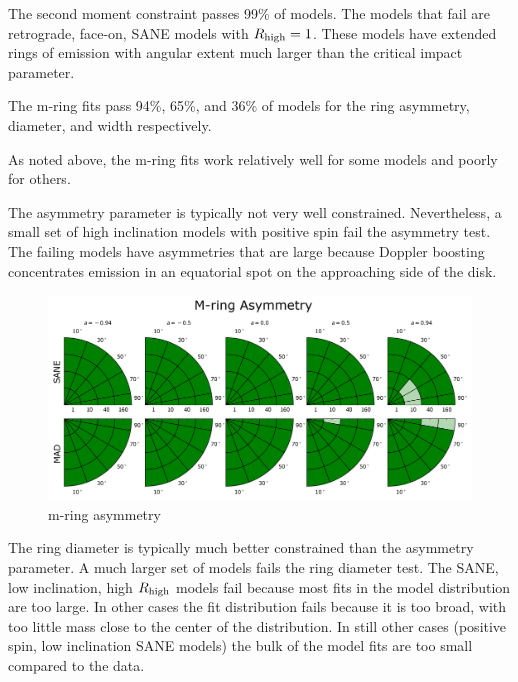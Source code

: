 The second moment constraint passes 99\% of models.  The models that fail are retrograde, face-on, SANE models with $R_\mathrm{high} = 1$. These models have extended rings of emission with angular extent much larger than the critical impact parameter.


The m-ring fits pass 94\%, 65\%, and 36\% of models for the ring asymmetry, diameter, and width respectively.

As noted above, the m-ring fits work relatively well for some models and poorly for others.

The asymmetry parameter is typically not very well constrained.  Nevertheless, a small set of high inclination models with positive spin fail the asymmetry test.  The failing models have asymmetries that are large because Doppler boosting concentrates emission in an equatorial spot on the approaching side of the disk.

\begin{figure}
  \centering
  \includegraphics[width=\columnwidth]{./figures/Mring_f1_Constraints.png}
  \caption{m-ring asymmetry}
  \label{fig:cmp_m-ring_asymm}
\end{figure}

The ring diameter is typically much better constrained than the asymmetry parameter.
A much larger set of models fails the ring diameter test.
The SANE, low inclination, high $R_\mathrm{high}$ models fail because most fits in the model distribution are too large.  In other cases the fit distribution fails because it is too broad, with too little mass close to the center of the distribution.  In still other cases (positive spin, low inclination SANE models) the bulk of the model fits are too small compared to the data.

